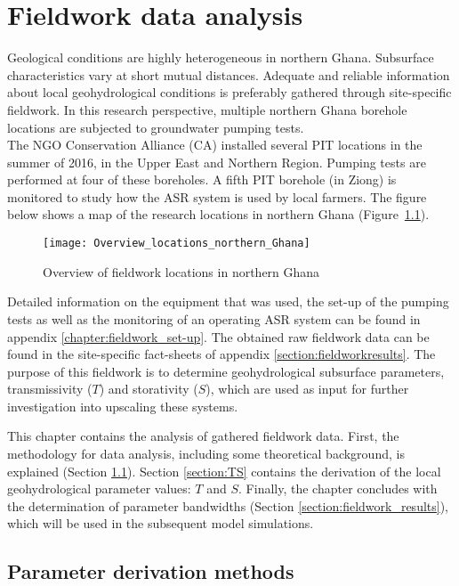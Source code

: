 \chapter{Fieldwork data analysis}
Geological conditions are highly heterogeneous in northern Ghana. Subsurface characteristics vary at short mutual distances. Adequate and reliable information about local geohydrological conditions is preferably gathered through site-specific fieldwork. In this research perspective, multiple northern Ghana borehole locations are subjected to groundwater pumping tests. 
\bigskip \\
The NGO Conservation Alliance (CA) installed several PIT locations in the summer of 2016, in the Upper East and Northern Region. Pumping tests are performed at four of these boreholes. A fifth PIT borehole (in Ziong) is monitored to study how the ASR system is used by local farmers. The figure below shows a map  of the research locations in northern Ghana (Figure~\ref{fig:Overviewlocations}).
\bigskip 

\begin{figure}[ht]
 \centering
 \texttt{[image: Overview\_locations\_northern\_Ghana]}
 \captionsetup{justification=centering} 
 \caption{Overview of fieldwork locations in northern Ghana}
 \label{fig:Overviewlocations}
\end{figure}

Detailed information on the equipment that was used, the set-up of the pumping tests as well as the monitoring of an operating ASR system can be found in appendix \ref{chapter:fieldwork_set-up}. The obtained raw fieldwork data can be found in the site-specific fact-sheets of appendix \ref{section:fieldworkresults}. The purpose of this fieldwork is to determine geohydrological subsurface parameters, transmissivity ($T$) and storativity ($S$), which are used as input for further investigation into upscaling these systems. 

This chapter contains the analysis of gathered fieldwork data. First, the methodology for data analysis, including some theoretical background, is explained (Section \ref{section:derivation_methods}). Section \ref{section:TS} contains the derivation of the local geohydrological parameter values: $T$ and $S$. Finally, the chapter concludes with the determination of parameter bandwidths (Section \ref{section:fieldwork_results}), which will be used in the subsequent model simulations. 

\section{Parameter derivation methods}
\label{section:derivation_methods}

